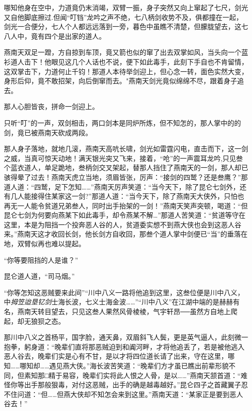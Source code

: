 \documentclass[12pt,oneside]{book}
\begin{document}
哪知他身在空中，力道竟仍末消竭，双臂一振，身子突然又向上窜起了七尺，剑光又自他脚底擦过.但闻``叮铛''龙吟之声不绝，七八柄剑收势不及，俱都撞在一起，剑光一合便分，七人个人都远远落到一旁，暮色中虽瞧不清楚，但朦胧望去，这七八人中，竟有四个是出家的道人。

燕南天双足一蹬，方自掠到车顶，竟又箭也似的窜了出去双掌如风，当头向一个蓝衫道人击下！他眼见这几个人话也不说，便下如此毒手，此刻下手自也不肯留情，这双掌击下，力道何止千钧！那道人本待举剑迎上，但心念一转，面色实然大变，身形后仰，竟不敢招架，向后倒窜而去。"燕南天剑光竟似绵绵不尽，跟着身子追去。

那人心胆皆丧，拼命一剑迎上。

只听``叮''的一声，双剑相击，两口剑本是同炉所炼，但不知怎的，那人掌中的的剑，竟已被燕南天砍成两段。

那人身子落地，就地几滚，燕南天高吭长啸，剑光如雷霆闪电，直击而下，这一剑之威，当真可惊天动地！满天银光突又飞来，接着，``呛''的一声震耳龙吟,只见叁个蓝衣道人，单足跪地，叁柄剑交叉架起，替那人挡住了燕南天的一剑，那人却已骇得晕了过去！燕南天虎立当地，须眉皆张，厉声：``接剑的四鹫？还是叁鹰？''那道人道：``四鹫，足下怎知\ldots\ldots{}''燕南天厉声笑道：``当今天下，除了昆仑七剑外，还有几人能接得住某家这一剑?''那道人道：``当今天下，除了燕南天大侠外，只怕也再无一人能令贫道兄弟叁人，同时出手抬架的一剑！''燕南天笑声突顿，喝道：``但昆仑七剑为何要向燕某下如此毒手，却令燕某不解\ldots{}''那道人苦笑道：``贫道等守在这里，本是为阻挡一个投奔恶人谷的人，贫道委实想不到燕大侠也会到这恶人谷来。''燕南天这才收回长剑，他长剑方自收回，那叁个道人掌中剑便已``当''的垂落在地，双臂似再也难以提起。

``你等要阻挡的人是谁？''

昆仑道人道，``司马烟。''

``你等怎知这恶贼要来此间''``川中八义一路将他追到这里，这叁位便是川中八义，中\emph{拇笠迨垦钇剑}士海长波，七义士海金波\ldots\ldots{}''``川中八义''在江湖中端的是赫赫有名，燕南天转目望去，只见这叁人果然风骨棱棱，气宇轩昂──虽然方自地上爬起，却无狼狈之态。

那川中八义之首杨平，国字脸，通天鼻，双眉斜飞人鬓，更是英气逼人，此刻微一抱拳，躬身道：``晚辈们直将那恶贼迫到和阗河畔，才将他追丢了，若是被他逃入恶人谷去，晚辈们实是心有不甘，是以才将四位道长请了出来，守在这里，哪知\ldots\ldots 哪知却\ldots\ldots 遇见燕大侠。''海长波苦笑道：``晚辈们方才虽已瞧出前辈形貌不同，但素知那□精于易容，晚辈们实将此人恨之人骨，是以\ldots\ldots{}''燕南天颔首道：``难怪你等出手那般狠毒，对付这恶贼，出手的确是越毒越好。''昆仑四子之首藏翼子忍不住问道：``但\ldots\ldots 但燕大侠却不知怎会来到这里。''燕南天道：``某家正是要到恶人谷去！''
\end{document}
